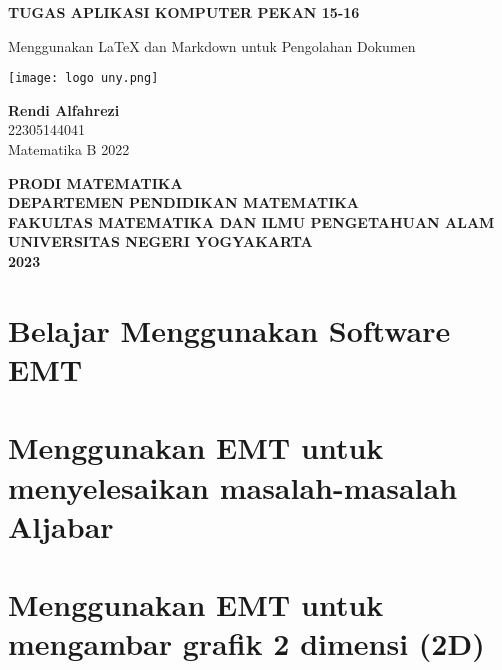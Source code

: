 \documentclass{report}
\begin{document}
\begin{titlepage}
    \begin{center}
        \vspace*{0,2cm}

        \Huge
        \textbf{TUGAS APLIKASI KOMPUTER PEKAN 15-16}
        
        \vspace{1cm}
        
        \LARGE
        Menggunakan LaTeX dan Markdown untuk Pengolahan Dokumen
        
        \vspace{1cm}
        
        \texttt{[image: logo uny.png]}

        \vspace{1cm}
        
        \textbf{Rendi Alfahrezi}\\
        22305144041\\
        Matematika B 2022
        
        \vspace{2cm}
        
        \Large
        \textbf{PRODI MATEMATIKA}\\
        \textbf{DEPARTEMEN PENDIDIKAN MATEMATIKA}\\
        \textbf{FAKULTAS MATEMATIKA DAN ILMU PENGETAHUAN ALAM}
        \textbf{UNIVERSITAS NEGERI YOGYAKARTA}\\
        \textbf{2023}
        
    \end{center}
\end{titlepage}

\newpage
\tableofcontents

\chapter{Belajar Menggunakan Software EMT}


\newpage
\chapter{Menggunakan EMT untuk menyelesaikan masalah-masalah Aljabar}


\newpage
\chapter{Menggunakan EMT untuk mengambar grafik 2 dimensi (2D)}

\end{document}
